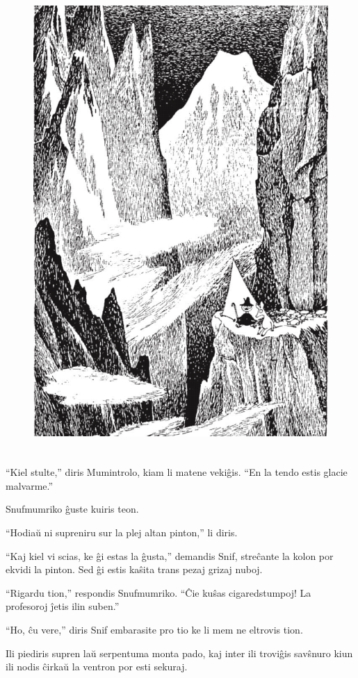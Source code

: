 \begin{figure}[htbp]
\centering
\includegraphics[width=343pt,height=500pt]{4-1.png}
\caption{}
\label{4-1}
\end{figure}

``Kiel stulte,'' diris Mumintrolo, kiam li matene vekiĝis. ``En la tendo estis glacie malvarme.''

Snufmumriko ĝuste kuiris teon.

``Hodiaŭ ni supreniru sur la plej altan pinton,'' li diris.

``Kaj kiel vi scias, ke ĝi estas la ĝusta,'' demandis Snif, streĉante la kolon por ekvidi la pinton. Sed ĝi estis kaŝita trans pezaj grizaj nuboj.

``Rigardu tion,'' respondis Snufmumriko. ``Ĉie kuŝas cigaredstumpoj! La profesoroj ĵetis ilin suben.''

``Ho, ĉu vere,'' diris Snif embarasite pro tio ke li mem ne eltrovis tion.

Ili piediris supren laŭ serpentuma monta pado, kaj inter ili troviĝis savŝnuro kiun ili nodis ĉirkaŭ la ventron por esti sekuraj.

